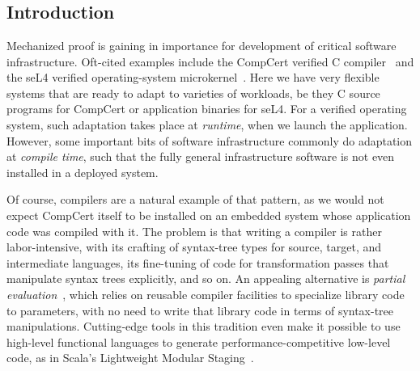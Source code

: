 \chapter{}\label{ch:rewriting}

\section{Introduction}\label{sec:rewriting:intro}


Mechanized proof is gaining in importance for development of critical software infrastructure.
Oft-cited examples include the CompCert verified C compiler~\cite{Compcert} and the seL4 verified operating-system microkernel~\cite{seL4SOSP09}.
Here we have very flexible systems that are ready to adapt to varieties of workloads, be they C source programs for CompCert or application binaries for seL4.
For a verified operating system, such adaptation takes place at \emph{runtime}, when we launch the application.
However, some important bits of software infrastructure commonly do adaptation at \emph{compile time}, such that the fully general infrastructure software is not even installed in a deployed system.

Of course, compilers are a natural example of that pattern, as we would not expect CompCert itself to be installed on an embedded system whose application code was compiled with it.
The problem is that writing a compiler is rather labor-intensive, with its crafting of syntax-tree types for source, target, and intermediate languages, its fine-tuning of code for transformation passes that manipulate syntax trees explicitly, and so on.
An appealing alternative is \emph{partial evaluation}~\cite{PartialEvaluation}, which relies on reusable compiler facilities to specialize library code to parameters, with no need to write that library code in terms of syntax-tree manipulations.
Cutting-edge tools in this tradition even make it possible to use high-level functional languages to generate performance-competitive low-level code, as in Scala's Lightweight Modular Staging~\cite{LMS}.

